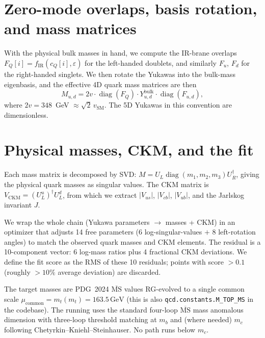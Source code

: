\documentclass[11pt]{article}
\begin{document}
\section{Zero-mode overlaps, basis rotation, and mass matrices}

With the physical bulk masses in hand, we compute the IR-brane overlaps
$F_Q[i] = f_{\mathrm{IR}}(c_Q[i], \varepsilon)$ for the left-handed doublets,
and similarly $F_u$, $F_d$ for the right-handed singlets. We then rotate the
Yukawas into the bulk-mass eigenbasis, and the effective 4D quark mass matrices are then
\begin{equation}
  M_{u,d} = 2v \cdot \operatorname{diag}(F_Q) \cdot Y_{u,d}^{\mathrm{bulk}}
    \cdot \operatorname{diag}(F_{u,d}),
\end{equation}
where $2v = 348$~GeV $\approx \sqrt{2}\,v_{\mathrm{SM}}$. The 5D Yukawas
in this convention are dimensionless. 


\section{Physical masses, CKM, and the fit}

Each mass matrix is decomposed by SVD:
$M = U_L \operatorname{diag}(m_1, m_2, m_3) U_R^\dagger$, giving the physical
quark masses as singular values. The CKM matrix is $V_{\mathrm{CKM}} =
(U_L^u)^\dagger U_L^d$, from which we extract $|V_{us}|$, $|V_{cb}|$,
$|V_{ub}|$, and the Jarlskog invariant $J$.

We wrap the whole chain (Yukawa parameters $\to$ masses + CKM) in an optimizer that adjusts 14 free parameters (6
log-singular-values $+$ 8 left-rotation angles) to match the observed quark
masses and CKM elements. The residual is a 10-component vector: 6 log-mass
ratios plus 4 fractional CKM deviations. We define the fit score as the RMS
of these 10 residuals; points with score $> 0.1$ (roughly $> 10\%$ average
deviation) are discarded.

The target masses are PDG~2024 $\overline{\mathrm{MS}}$ values RG-evolved
to a single common scale $\mu_{\mathrm{common}} = m_t(m_t) = 163.5\,\mathrm{GeV}$
(this is also \texttt{qcd.constants.M\_TOP\_MS} in the codebase). The
running uses the standard four-loop $\overline{\mathrm{MS}}$ mass anomalous
dimension with three-loop threshold matching at $m_b$ and (where needed)
$m_c$ following Chetyrkin--Kniehl--Steinhauser. No path runs below $m_c$.
\end{document}
